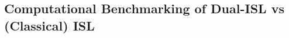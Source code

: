 \documentclass{article}
\newcommand{\normdist}[2]{\mathcal{N}(#1, #2)}
\begin{document}
\subsection{Computational Benchmarking of Dual-ISL vs (Classical) ISL}

\end{document}
